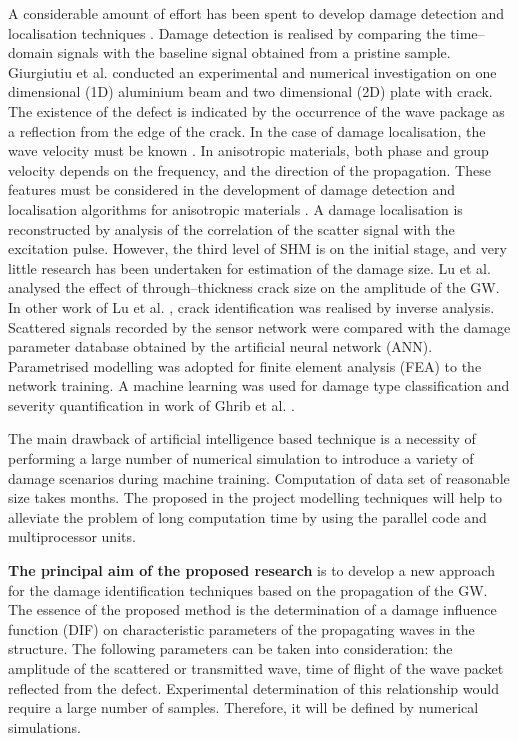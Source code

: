 \documentclass[a4paper,12pt]{article}
\begin{document}
A considerable amount of effort has been spent to develop damage detection and localisation techniques \cite{mitra2016guided}. Damage detection is realised by comparing the time--domain signals with the baseline signal obtained from a pristine sample. Giurgiutiu et al. \cite{giurgiutiu2003piezoelectric} conducted an experimental and numerical investigation on one dimensional (1D) aluminium beam and two dimensional (2D) plate with crack. The existence of the defect is indicated by the occurrence of the wave package as a reflection from the edge of the crack. In the case of damage localisation, the wave velocity must be known \cite{michaels2008detection}. In anisotropic materials, both phase and group velocity depends on the frequency, and the direction of the propagation. These features must be considered in the development of damage detection and localisation algorithms for anisotropic materials \cite{kudela2008damage, ng2009lamb}. A damage localisation is reconstructed by analysis of the correlation of the scatter signal with the excitation pulse. 
However, the third level of SHM is on the initial stage, and very little research has been undertaken for estimation of the damage size. Lu et al. \cite{lu2008quantitative} analysed the effect of through--thickness crack size on the amplitude of the GW. In other work of Lu et al. \cite{lu2009artificial}, crack identification was realised by inverse analysis. Scattered signals recorded by the sensor network were compared with the damage parameter database obtained by the artificial neural network (ANN). Parametrised modelling was adopted for finite element analysis (FEA) to the network training. A machine learning was used for damage type classification and severity quantification in work of Ghrib et al. \cite{ghrib2018automatic}.

The main drawback of artificial intelligence based technique is a necessity of performing a large number of numerical simulation to introduce a variety of damage scenarios during machine training. Computation of data set of reasonable size takes months. The proposed in the project modelling techniques will help to alleviate the problem of long computation time by using the parallel code and multiprocessor units.

\textbf{The principal aim of the proposed research} is to develop a new approach for the damage identification techniques based on the propagation of the GW. The essence of the proposed method is the determination of a damage influence function (DIF) on characteristic parameters of the propagating waves in the structure. The following parameters can be taken into consideration: the amplitude of the scattered or transmitted wave, time of flight of the wave packet reflected from the defect. Experimental determination of this relationship would require a large number of samples. Therefore, it will be defined by numerical simulations.
\end{document}
